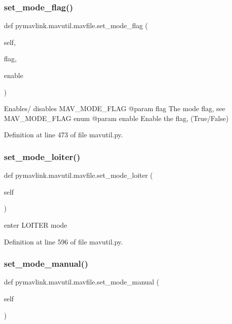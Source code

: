 \subsubsection{\texorpdfstring{set\_mode\_flag()}{set\_mode\_flag()}}
{\footnotesize\ttfamily def pymavlink.\+mavutil.\+mavfile.\+set\+\_\+mode\+\_\+flag (\begin{DoxyParamCaption}\item[{}]{self,  }\item[{}]{flag,  }\item[{}]{enable }\end{DoxyParamCaption})}

\begin{DoxyVerb}Enables/ disables MAV_MODE_FLAG
@param flag The mode flag, 
  see MAV_MODE_FLAG enum
@param enable Enable the flag, (True/False)
\end{DoxyVerb}
 

Definition at line 473 of file mavutil.\+py.

\mbox{\label{classpymavlink_1_1mavutil_1_1mavfile_a93705650b06f0debf62ff0ddc8e1bfee}} 
\subsubsection{\texorpdfstring{set\_mode\_loiter()}{set\_mode\_loiter()}}
{\footnotesize\ttfamily def pymavlink.\+mavutil.\+mavfile.\+set\+\_\+mode\+\_\+loiter (\begin{DoxyParamCaption}\item[{}]{self }\end{DoxyParamCaption})}

\begin{DoxyVerb}enter LOITER mode\end{DoxyVerb}
 

Definition at line 596 of file mavutil.\+py.

\mbox{\label{classpymavlink_1_1mavutil_1_1mavfile_aeff1ba57a638061a1eaca1286d9c5642}} 
\subsubsection{\texorpdfstring{set\_mode\_manual()}{set\_mode\_manual()}}
{\footnotesize\ttfamily def pymavlink.\+mavutil.\+mavfile.\+set\+\_\+mode\+\_\+manual (\begin{DoxyParamCaption}\item[{}]{self }\end{DoxyParamCaption})}

